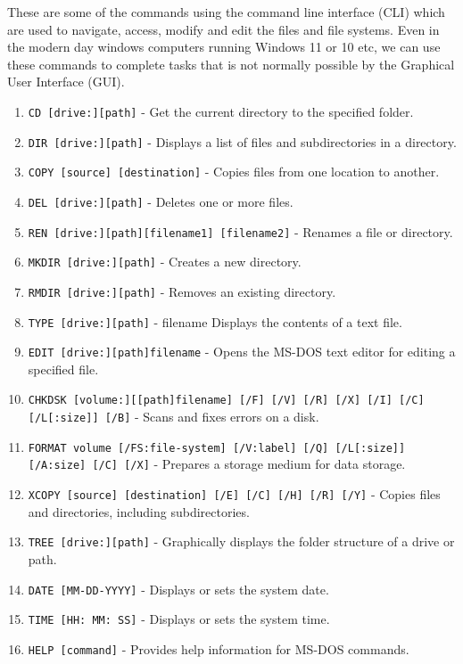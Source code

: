 These are some of the commands using the command line interface (CLI) which are used to navigate, access, modify and edit the files and file systems. Even in the modern day windows computers running Windows 11 or 10 etc, we can use these commands to complete tasks that is not normally possible by the Graphical User Interface (GUI). \cite{geeksforgeeksMSDosCommands}

\begin{enumerate}
    \item \texttt{CD [drive:][path]} - Get the current directory to the specified folder.
    \item \texttt{DIR [drive:][path]} - Displays a list of files and subdirectories in a directory.
    \item \texttt{COPY [source] [destination]} - Copies files from one location to another.
    \item \texttt{DEL [drive:][path]} - Deletes one or more files.
    \item \texttt{REN [drive:][path][filename1] [filename2]} - Renames a file or directory.
    \item \texttt{MKDIR [drive:][path]} - Creates a new directory.
    \item \texttt{RMDIR [drive:][path]} - Removes an existing directory.
    \item \texttt{TYPE [drive:][path]} - filename Displays the contents of a text file.
    \item \texttt{EDIT [drive:][path]filename} - Opens the MS-DOS text editor for editing a specified file.
    \item \texttt{CHKDSK [volume:][[path]filename] [/F] [/V] [/R] [/X] [/I] [/C] [/L[:size]] [/B]} - Scans and fixes errors on a disk.
    \item \texttt{FORMAT volume [/FS:file-system] [/V:label] [/Q] [/L[:size]] [/A:size] [/C] [/X]} - Prepares a storage medium for data storage.
    \item \texttt{XCOPY [source] [destination] [/E] [/C] [/H] [/R] [/Y]} - Copies files and directories, including subdirectories.
    \item \texttt{TREE [drive:][path]} - Graphically displays the folder structure of a drive or path.
    \item \texttt{DATE [MM-DD-YYYY]} - Displays or sets the system date.
    \item \texttt{TIME [HH: MM: SS]} - Displays or sets the system time.
    \item \texttt{HELP [command]} - Provides help information for MS-DOS commands.

\end{enumerate}
